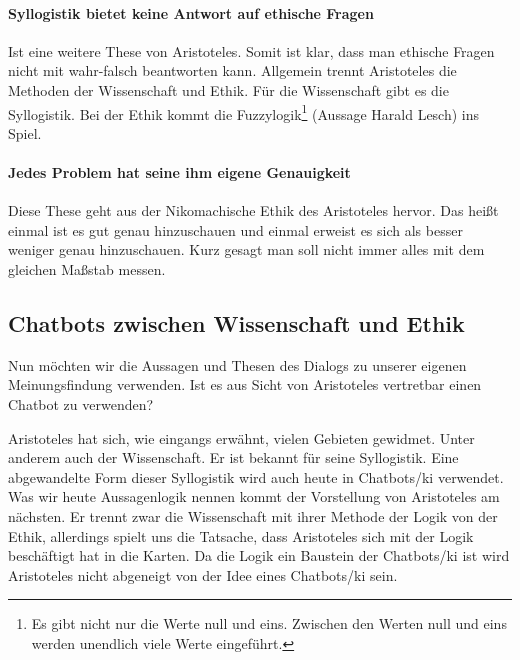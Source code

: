 \paragraph{Syllogistik bietet keine Antwort auf ethische Fragen} 
Ist eine weitere These von Aristoteles. Somit ist klar, dass man ethische Fragen nicht mit wahr-falsch beantworten kann. Allgemein trennt Aristoteles die Methoden der Wissenschaft und Ethik. Für die Wissenschaft gibt es die Syllogistik. Bei der Ethik kommt die Fuzzylogik\footnote{Es gibt nicht nur die Werte null und eins. Zwischen  den Werten null und eins werden unendlich viele Werte eingeführt.} (Aussage Harald Lesch) ins Spiel.

\paragraph{Jedes Problem hat seine ihm eigene Genauigkeit} 
Diese These geht aus der Nikomachische Ethik des Aristoteles hervor. Das heißt einmal ist es gut genau hinzuschauen und einmal erweist es sich als besser weniger genau hinzuschauen. Kurz gesagt man soll nicht immer alles mit dem gleichen Maßstab messen.

\subsection{Chatbots zwischen Wissenschaft und Ethik}

Nun möchten wir die Aussagen und Thesen des Dialogs zu unserer eigenen Meinungsfindung verwenden. Ist es aus Sicht von Aristoteles vertretbar einen Chatbot zu verwenden? 

Aristoteles hat sich, wie eingangs erwähnt, vielen Gebieten gewidmet. Unter anderem auch der Wissenschaft. Er ist bekannt für seine Syllogistik. Eine abgewandelte Form dieser Syllogistik wird auch heute in Chatbots/\ac{ki} verwendet. Was wir heute Aussagenlogik nennen kommt der Vorstellung von Aristoteles am nächsten. Er trennt zwar die Wissenschaft mit ihrer Methode der Logik von der Ethik, allerdings spielt uns die Tatsache, dass Aristoteles sich mit der Logik beschäftigt hat in die Karten. Da die Logik ein Baustein der Chatbots/\ac{ki} ist wird Aristoteles nicht abgeneigt von der Idee eines Chatbots/\ac{ki} sein. 

